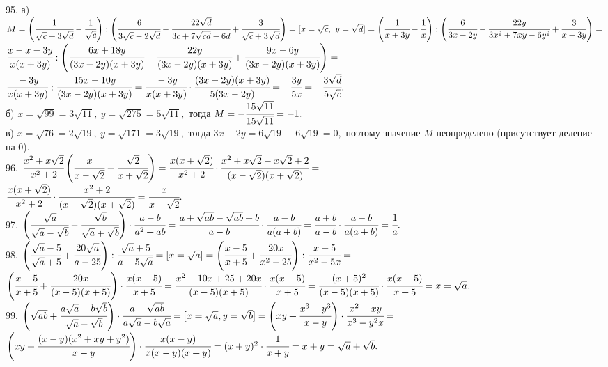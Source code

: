 \documentclass[12pt]{article}
\begin{document}
95. а) $M=\left(\cfrac{1}{\sqrt{c}+3\sqrt{d}}-\cfrac{1}{\sqrt{c}}\right):\left(\cfrac{6}{3\sqrt{c}-2\sqrt{d}}-\cfrac{22\sqrt{d}}{3c+7\sqrt{cd}-6d}+\cfrac{3}{\sqrt{c}+3\sqrt{d}}\right)=
[x=\sqrt{c},\ y=\sqrt{d}]=
\left(\cfrac{1}{x+3y}-\cfrac{1}{x}\right):\left(\cfrac{6}{3x-2y}-\cfrac{22y}{3x^2+7xy-6y^2}+\cfrac{3}{x+3y}\right)=$\\$
\cfrac{x-x-3y}{x(x+3y)}:\left(\cfrac{6x+18y}{(3x-2y)(x+3y)}-\cfrac{22y}{(3x-2y)(x+3y)}+\cfrac{9x-6y}{(3x-2y)(x+3y)}\right)=$\\$
\cfrac{-3y}{x(x+3y)}:\cfrac{15x-10y}{(3x-2y)(x+3y)}=\cfrac{-3y}{x(x+3y)}\cdot\cfrac{(3x-2y)(x+3y)}{5(3x-2y)}=-\cfrac{3y}{5x}=-\cfrac{3\sqrt{d}}{5\sqrt{c}}.$\\
б) $x=\sqrt{99}=3\sqrt{11},\ y=\sqrt{275}=5\sqrt{11},$ тогда $M=-\cfrac{15\sqrt{11}}{15\sqrt{11}}=-1.$\\
в) $x=\sqrt{76}=2\sqrt{19},\ y=\sqrt{171}=3\sqrt{19},$ тогда $3x-2y=6\sqrt{19}-6\sqrt{19}=0,$ поэтому значение $M$ неопределено (присутствует деление на 0).\\
96. $\cfrac{x^2+x\sqrt{2}}{x^2+2}\left(\cfrac{x}{x-\sqrt{2}}-\cfrac{\sqrt{2}}{x+\sqrt{2}}\right)=
\cfrac{x(x+\sqrt{2})}{x^2+2}\cdot\cfrac{x^2+x\sqrt{2}-x\sqrt{2}+2}{(x-\sqrt{2})(x+\sqrt{2})}=$\\$
\cfrac{x(x+\sqrt{2})}{x^2+2}\cdot\cfrac{x^2+2}{(x-\sqrt{2})(x+\sqrt{2})}=\cfrac{x}{x-\sqrt{2}}.$\\
97. $\left(\cfrac{\sqrt{a}}{\sqrt{a}-\sqrt{b}}-\cfrac{\sqrt{b}}{\sqrt{a}+\sqrt{b}}\right)\cdot\cfrac{a-b}{a^2+ab}=
\cfrac{a+\sqrt{ab}-\sqrt{ab}+b}{a-b}\cdot\cfrac{a-b}{a(a+b)}=
\cfrac{a+b}{a-b}\cdot\cfrac{a-b}{a(a+b)}=\cfrac{1}{a}.$\\
98. $\left(\cfrac{\sqrt{a}-5}{\sqrt{a}+5}+\cfrac{20\sqrt{a}}{a-25}\right):\cfrac{\sqrt{a}+5}{a-5\sqrt{a}}=[x=\sqrt{a}]=
\left(\cfrac{x-5}{x+5}+\cfrac{20x}{x^2-25}\right):\cfrac{x+5}{x^2-5x}=$\\$
\left(\cfrac{x-5}{x+5}+\cfrac{20x}{(x-5)(x+5)}\right)\cdot\cfrac{x(x-5)}{x+5}=\cfrac{x^2-10x+25+20x}{(x-5)(x+5)}\cdot\cfrac{x(x-5)}{x+5}=
\cfrac{(x+5)^2}{(x-5)(x+5)}\cdot\cfrac{x(x-5)}{x+5}=x=\sqrt{a}.$\\
99. $\left(\sqrt{ab}+\cfrac{a\sqrt{a}-b\sqrt{b}}{\sqrt{a}-\sqrt{b}}\right)\cdot\cfrac{a-\sqrt{ab}}{a\sqrt{a}-b\sqrt{a}}=
[x=\sqrt{a}, y=\sqrt{b}]=\left(xy+\cfrac{x^3-y^3}{x-y}\right)\cdot\cfrac{x^2-xy}{x^3-y^2x}=$\\$
\left(xy+\cfrac{(x-y)(x^2+xy+y^2)}{x-y}\right)\cdot\cfrac{x(x-y)}{x(x-y)(x+y)}=
(x+y)^2\cdot\cfrac{1}{x+y}=x+y=\sqrt{a}+\sqrt{b}.$\\
\end{document}
